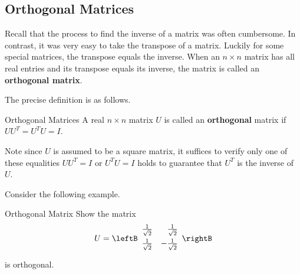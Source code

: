 \subsection{Orthogonal Matrices}

Recall that the process to find the inverse of a matrix was often cumbersome. 
In contrast, it was very easy to take the transpose of a matrix. Luckily for some special
matrices, the transpose equals the inverse. When an $n \times n$ matrix has all real
entries and its transpose equals its inverse, the matrix is called an \textbf{orthogonal matrix}. 

The precise definition is as follows. 

\begin{definition}{Orthogonal Matrices}\label{def:OrthoMatrix}
A real $n\times n$ matrix $U$ is called an
 \textbf{orthogonal} matrix if $UU^{T}=U^{T}U=I.$
\end{definition}

Note since $U$ is assumed to be a square matrix, it suffices to verify
only one of these equalities $UU^{T}=I$ or $U^{T}U=I$ holds to
guarantee that $U^T$ is the inverse of $U$.

Consider the following example. 

\begin{example}{Orthogonal Matrix}
Show the matrix
\begin{equation*}
U=\leftB
\begin{array}{rr}
\vspace{0.05in}\frac{1}{\sqrt{2}} & \frac{1}{\sqrt{2}} \\
\vspace{0.05in}\frac{1}{\sqrt{2}} & -\frac{1}{\sqrt{2}}
\end{array}
\rightB
\end{equation*}
is orthogonal.
\end{example}

